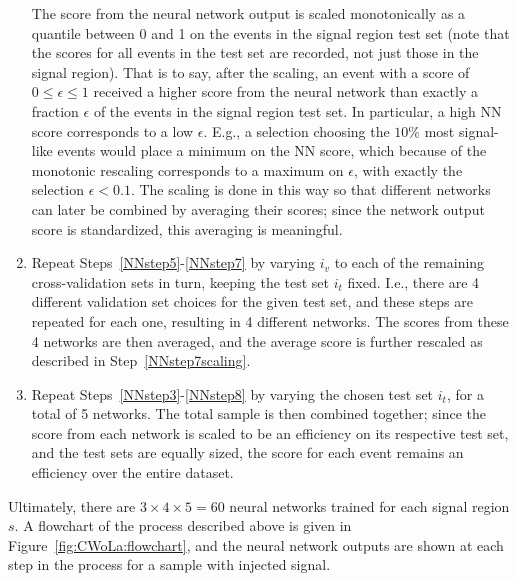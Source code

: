 \begin{enumerate}
  The score from the neural network output is scaled monotonically as a quantile between 0 and 1 on the events in the signal region test set (note that the scores for all events in the test set are recorded, not just those in the signal region).
  That is to say, after the scaling, an event with a score of $0 \le \epsilon \le 1$ received a higher score from the neural network than exactly a fraction $\epsilon$ of the events in the signal region test set.
  In particular, a high NN score corresponds to a low $\epsilon$.
  E.g., a selection choosing the $10\%$ most signal-like events would place a minimum on the NN score, which because of the monotonic rescaling corresponds to a maximum on $\epsilon$, with exactly the selection $\epsilon<0.1$.
  The scaling is done in this way so that different networks can later be combined by averaging their scores; since the network output score is standardized, this averaging is meaningful.
  \item Repeat Steps~\ref{NNstep5}-\ref{NNstep7} by varying $i_v$ to each of the remaining cross-validation sets in turn, keeping the test set $i_t$ fixed.
    I.e., there are 4 different validation set choices for the given test set, and these steps are repeated for each one, resulting in 4 different networks.
    The scores from these 4 networks are then averaged, and the average score is further rescaled as described in Step~\ref{NNstep7scaling}.
  \label{NNstep8}
  \item Repeat Steps~\ref{NNstep3}-\ref{NNstep8} by varying the chosen test set $i_t$, for a total of 5 networks.
  The total sample is then combined together; since the score from each network is scaled to be an efficiency on its respective test set, and the test sets are equally sized, the score for each event remains an efficiency over the entire dataset.
  \label{NNstep9}
\end{enumerate}

Ultimately, there are $3\times4\times5 = 60$ neural networks trained for each signal region $s$. A flowchart of the process described above is given in Figure~\ref{fig:CWoLa:flowchart}, and the neural network outputs are shown at each step in the process for a sample with injected signal.

